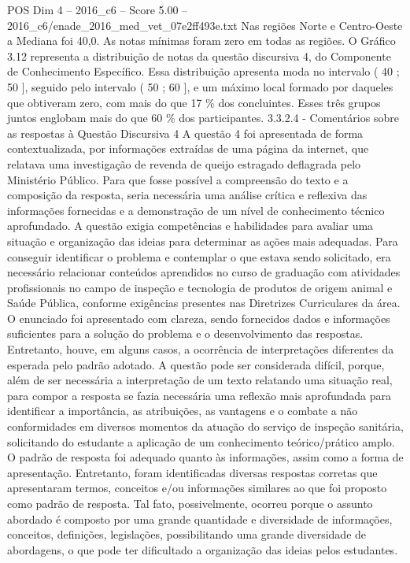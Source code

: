 \begin{textsample}{POS Dim 4 – 2016\_c6 – Score 5.00 – 2016\_c6/enade\_2016\_med\_vet\_07e2ff493e.txt}
Nas regiões Norte e Centro-Oeste a Mediana foi 40,0.
As notas mínimas foram zero em todas as regiões.
O Gráfico 3.12 representa a distribuição de notas da questão discursiva 4, do Componente de Conhecimento Específico.
Essa distribuição apresenta moda no intervalo ( 40 ; 50 ], seguido pelo intervalo ( 50 ; 60 ], e um máximo local formado por daqueles que obtiveram zero, com mais do que 17 \% dos concluintes.
Esses três grupos juntos englobam mais do que 60 \% dos participantes. 3.3.2.4 - Comentários sobre as respostas à Questão Discursiva 4 A questão 4 foi apresentada de forma contextualizada, por informações extraídas de uma página da internet, que relatava uma investigação de revenda de queijo estragado deflagrada pelo Ministério Público.
Para que fosse possível a compreensão do texto e a composição da resposta, seria necessária uma análise crítica e reflexiva das informações fornecidas e a demonstração de um nível de conhecimento técnico aprofundado.
A questão exigia competências e habilidades para avaliar uma situação e organização das ideias para determinar as ações mais adequadas.
Para conseguir identificar o problema e contemplar o que estava sendo solicitado, era necessário relacionar conteúdos aprendidos no curso de graduação com atividades profissionais no campo de inspeção e tecnologia de produtos de origem animal e Saúde Pública, conforme exigências presentes nas Diretrizes Curriculares da área.
O enunciado foi apresentado com clareza, sendo fornecidos dados e informações suficientes para a solução do problema e o desenvolvimento das respostas.
Entretanto, houve, em alguns casos, a ocorrência de interpretações diferentes da esperada pelo padrão adotado.
A questão pode ser considerada difícil, porque, além de ser necessária a interpretação de um texto relatando uma situação real, para compor a resposta se fazia necessária uma reflexão mais aprofundada para identificar a importância, as atribuições, as vantagens e o combate a não conformidades em diversos momentos da atuação do serviço de inspeção sanitária, solicitando do estudante a aplicação de um conhecimento teórico/prático amplo.
O padrão de resposta foi adequado quanto às informações, assim como a forma de apresentação.
Entretanto, foram identificadas diversas respostas corretas que apresentaram termos, conceitos e/ou informações similares ao que foi proposto como padrão de resposta.
Tal fato, possivelmente, ocorreu porque o assunto abordado é composto por uma grande quantidade e diversidade de informações, conceitos, definições, legislações, possibilitando uma grande diversidade de abordagens, o que pode ter dificultado a organização das ideias pelos estudantes.

\end{textsample}
